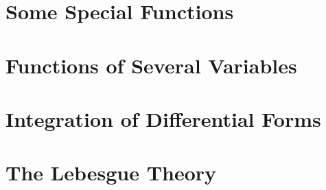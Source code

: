 \documentclass{tufte-book}
\begin{document}
\chapter{Some Special Functions}\label{chap:special-funcs}


\chapter{Functions of Several Variables}\label{chap:multivariable}


\chapter{Integration of Differential Forms}\label{chap:forms}


\chapter{The Lebesgue Theory}\label{chap:lebesgue}

\end{document}
